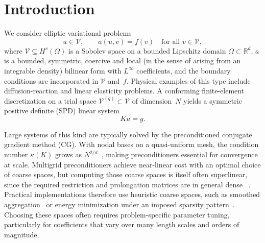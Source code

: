 \documentclass[hidelinks]{siamart}
\theoremstyle{nonumberplain}
\numberwithin{theorem}{section}
\begin{document}
\section{Introduction}
\label{sec:intro}
We consider elliptic variational problems
\begin{equation}\label{eq:general_problem}
  u\in\mathcal V,\qquad
  a(u,v)=f(v)\quad\text{for all }v\in\mathcal V,
\end{equation}
where $\mathcal V \subseteq H^s(\Omega)$ is a Sobolev space on a bounded
Lipschitz domain $\Omega \subset \mathbb{R}^d$, $a$ is a bounded,
symmetric, coercive and local (in the sense of arising from an integrable density) bilinear form with $L^\infty$
coefficients, and the boundary conditions are incorporated in
$\mathcal V$ and~$f$. Physical examples of this type include diffusion-reaction and linear elasticity problems.  A
conforming finite-element discretization on a trial space
$\mathcal V^{(q)} \subset \mathcal V$ of dimension~$N$ yields a symmetric
positive definite (SPD) linear system
\begin{equation}\label{eq:linear_system}
  Ku = g .
\end{equation}

Large systems of this kind are typically solved by the preconditioned conjugate
gradient method (CG).  With nodal bases on a quasi-uniform mesh, the condition number $\kappa(K)$ grows as
$N^{2/d}$~\cite{ErnGuermond2004}, making preconditioners essential for convergence at scale.  Multigrid preconditioners achieve
near-linear cost with an optimal choice of coarse spaces, but
computing those coarse spaces is itself often superlinear, since the required restriction and prolongation matrices are in general dense ~\cite{brannick2019role}.
Practical implementations therefore use heuristic coarse spaces, such as smoothed
aggregation~\cite{saad2003iterative} or energy minimization under an
imposed sparsity pattern~\cite{Wan1998EnergyMinimizing}.  Choosing these
spaces often requires problem-specific parameter tuning, particularly for
coefficients that vary over many length scales and orders of
magnitude.
\end{document}

